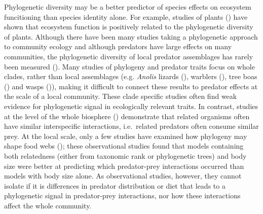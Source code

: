 \documentclass[11pt]{article}
\begin{document}
Phylogenetic diversity may be a better predictor of species effects on ecosystem funcitioning than species identity alone. For example, studies of
plants (\citealt{Cadotte2008}) have shown that ecosystem function is
positively related to the phylogenetic diversity of plants. Although
there have been many studies taking a phylogenetic approach to community
ecology and although predators have large effects on many communities,
the phylogenetic diversity of local predator assemblages has rarely been
measured (\citealt{Bersier2008, Naisbit2011}). Many studies of phylogeny and
predator traits focus on whole clades, rather than local assemblages
(e.g. \emph{Anolis} lizards (\citealt{Knouft2006}), warblers
(\citealt{Bohning-Gaese2003}), tree boas (\citealt{Henderson2013}) and wasps
(\citealt{Udriene2005})), making it difficult to connect these results to
predator effects at the scale of a local community. These clade specific
studies often find weak evidence for phylogenetic signal in ecologically
relevant traits. In contrast, studies at the level of the whole
biosphere (\citealt{Gomez2010, Bersier2008}) demonstrate that related
organisms often have similar interspecific interactions, i.e.~related
predators often consume similar prey. At the local scale, only a few
studies have examined how phylogeny may shape food webs
(\citealt{Rezende2009, Cagnolo2011}); these observational studies found that
models containing both relatedness (either from taxonomic rank or
phylogenetic trees) and body size were better at predicting which
predator-prey interactions occurred than models with body size alone. As
observational studies, however, they cannot isolate if it is differences
in predator distribution or diet that leads to a phylogenetic signal in
predator-prey interactions, nor how these interactions affect the whole
community.
\end{document}
